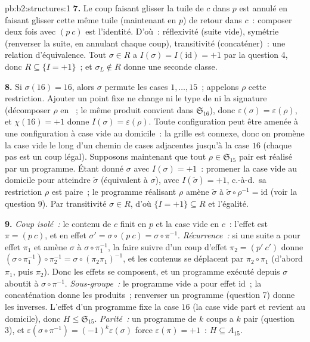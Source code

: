 \begin{solution}{pb:b2:structures:1}
\textbf{7.} Le coup faisant glisser la tuile de $c$ dans $p$ est
annulé en faisant glisser cette même tuile (maintenant en $p$) de
retour dans $c$~: composer deux fois avec $(p\ c)$ est l'identité.
D'où~: réflexivité (suite vide), symétrie (renverser la suite, en
annulant chaque coup), transitivité (concaténer)~: une relation
d'équivalence. Tout $\sigma \in R$ a $I(\sigma) = I(\mathrm{id}) = +1$
par la question 4, donc $R \subseteq \{I = +1\}$~; et $\sigma_L \notin
R$ donne une seconde classe.

\textbf{8.} Si $\sigma(16) = 16$, alors $\sigma$ permute les cases
$1, \dots, 15$~; appelons $\rho$ cette restriction. Ajouter un point
fixe ne change ni le type de  ni la signature (décomposer $\rho$
en ~; le même produit convient dans
$\mathfrak{S}_{16}$), donc $\varepsilon(\sigma) = \varepsilon(\rho)$,
et $\chi(16) = +1$ donne $I(\sigma) = \varepsilon(\rho)$. Toute
configuration peut être amenée à une configuration à case vide au
domicile~: la grille est connexe, donc on promène la case vide le
long d'un chemin de cases adjacentes jusqu'à la case $16$ (chaque pas
est un coup légal). Supposons maintenant que tout $\rho \in
\mathfrak{S}_{15}$ pair est réalisé par un programme. Étant donné
$\sigma$ avec $I(\sigma) = +1$~: promener la case vide au domicile
pour atteindre $\widetilde\sigma$ (équivalent à $\sigma$), avec
$I(\widetilde\sigma) = +1$, c.-à-d.\ sa restriction $\rho$ est
paire~; le programme réalisant $\rho$ amène $\widetilde\sigma$ à
$\widetilde\sigma \circ \rho^{-1} = \mathrm{id}$ (voir la question
9). Par transitivité $\sigma \in R$, d'où $\{I = +1\} \subseteq R$ et
l'égalité.

\textbf{9.} \emph{Coup isolé~:} le contenu de $c$ finit en $p$ et la
case vide en $c$~: l'effet est $\pi = (p\ c)$, et en effet $\sigma' =
\sigma \circ (p\ c) = \sigma \circ \pi^{-1}$. \emph{Récurrence~:} si
une suite a pour effet $\pi_1$ et amène $\sigma$ à $\sigma \circ
\pi_1^{-1}$, la faire suivre d'un coup d'effet $\pi_2 = (p'\ c')$
donne $(\sigma \circ \pi_1^{-1}) \circ \pi_2^{-1} = \sigma \circ
(\pi_2\pi_1)^{-1}$, et les contenus se déplacent par $\pi_2 \circ
\pi_1$ (d'abord $\pi_1$, puis $\pi_2$). Donc les effets se composent,
et un programme exécuté depuis $\sigma$ aboutit à $\sigma \circ
\pi^{-1}$. \emph{Sous-groupe~:} le programme vide a pour effet
$\mathrm{id}$~; la concaténation donne les produits~; renverser un
programme (question 7) donne les inverses. L'effet d'un programme fixe
la case $16$ (la case vide part et revient au domicile), donc $H \leq
\mathfrak{S}_{15}$. \emph{Parité~:} un programme de $k$ coups a $k$
pair (question 3), et $\varepsilon(\sigma \circ \pi^{-1}) =
(-1)^k\varepsilon(\sigma)$ force $\varepsilon(\pi) = +1$~: $H
\subseteq A_{15}$.


\end{solution}

